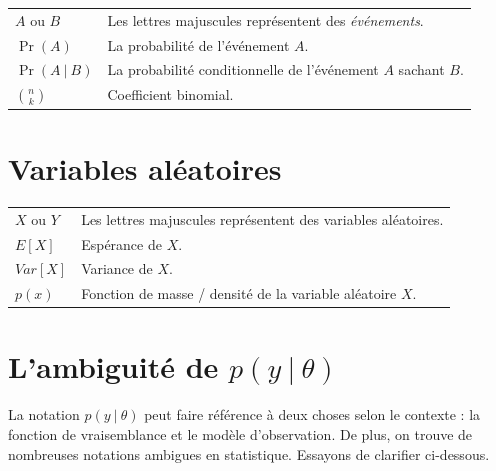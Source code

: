 \documentclass[
  a4paper,11pt,twoside,onecolumn,openright,final,oldfontcommands]{memoir}
\newcommand\nomenclature[2]{#1 & #2 \\}
\theoremstyle{definition}
\theoremstyle{definition}
\theoremstyle{definition}
\theoremstyle{definition}
\theoremstyle{remark}
\begin{document}
\begin{longtable}{@{}p{2cm}@{}p{\dimexpr\textwidth-2cm\relax}@{}}

\nomenclature{$A$ ou $B$}{Les lettres majuscules représentent des \textit{événements}.}
\nomenclature{$\Pr(A)$}{La probabilité de l'événement $A$.}
\nomenclature{$\Pr(A \:\vert\:B)$}{La probabilité conditionnelle de l'événement $A$ sachant $B$.}
\nomenclature{$\binom{n}{k}$}{Coefficient binomial.}

\end{longtable}

\hypertarget{variables-aluxe9atoires}{%
\section*{Variables aléatoires}\label{variables-aluxe9atoires}}

\begin{longtable}{@{}p{2cm}@{}p{\dimexpr\textwidth-2cm\relax}@{}}

\nomenclature{$X$ ou $Y$}{Les lettres majuscules représentent des variables aléatoires.}
\nomenclature{$E[X]$}{Espérance de $X$.}
\nomenclature{$Var[X]$}{Variance de $X$.}
\nomenclature{$p(x)$}{Fonction de masse / densité de la variable aléatoire $X$.}

\end{longtable}

\hypertarget{lambiguituxe9-de-py-verttheta}{%
\section*{\texorpdfstring{L'ambiguité de \(p(y \:\vert\:\theta)\)}{L'ambiguité de p(y \textbackslash:\textbackslash vert\textbackslash:\textbackslash theta)}}\label{lambiguituxe9-de-py-verttheta}}

La notation \(p(y \:\vert\:\theta)\) peut faire référence à deux choses selon le contexte : la fonction de vraisemblance et le modèle d'observation. De plus, on trouve de nombreuses notations ambigues en statistique. Essayons de clarifier ci-dessous.
\end{document}
